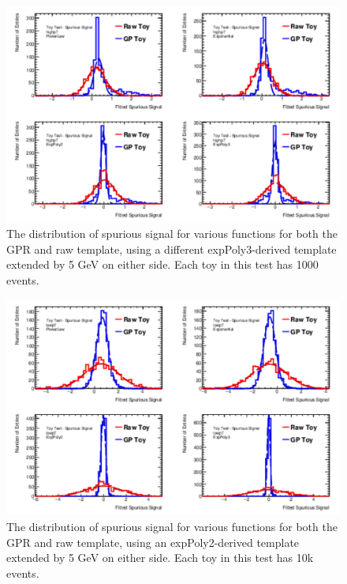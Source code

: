 \begin{figure} 
\begin{center}
  \includegraphics[width=\textwidth]{figures/background/gpr/validation/padded/ToyTest_FitSigVals_highpT_1000_noSig}   
\caption{The distribution of spurious signal for various functions for both the GPR and raw template, using a different expPoly3-derived template extended by 5 GeV on either side. Each toy in this test has 1000 events.}
\label{fig:padded_highpt_1000_noSig}
\end{center}
\end{figure}

\begin{figure} 
\begin{center}
  \includegraphics[width=\textwidth]{figures/background/gpr/validation/padded/ToyTest_FitSigVals_lowpT_10k_noSig}   
\caption{The distribution of spurious signal for various functions for both the GPR and raw template, using an expPoly2-derived template extended by 5 GeV on either side. Each toy in this test has 10k events.}
\label{fig:padded_lowpt_10k_noSig}
\end{center}
\end{figure}

